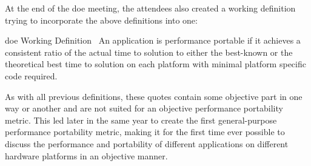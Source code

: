 At the end of the \gls{doe} meeting, the attendees also created a working definition trying to incorporate the above definitions into one: 
\begin{quotebox}{\gls{doe} Working Definition~\cite{doe_meeting_attendees_definition_2016}}
    An application is performance portable if it achieves a consistent ratio of the actual time to solution to either the best-known or the theoretical best time to solution on each platform with minimal platform specific code required.
\end{quotebox} %
As with all previous definitions, these quotes contain some objective part in one way or another and are not suited for an objective performance portability metric. 
This led \citeauthor{pennycook_metric_2016} later in the same year to create the first general-purpose performance portability metric, making it for the first time ever possible to discuss the performance and portability of different applications on different hardware platforms in an objective manner. 
